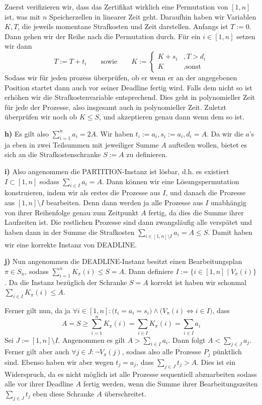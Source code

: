 \documentclass[a4paper,graphics,11pt]{article}
\begin{document}
Zuerst verifizieren wir, dass das Zertifikat wirklich eine Permutation von $[1,n]$ ist, was mit $n$ Speicherzellen
in linearer Zeit geht.
Daraufhin haben wir Variablen $K,T$, die jeweils momentane Strafkosten und Zeit darstellen.
Anfangs ist $T := 0$. Dann gehen wir der Reihe nach die Permutation durch. Für ein $i \in [1,n]$ setzen wir dann
$$
    T := T + t_i
    \qquad\text{sowie}\qquad
    K := \begin{cases}
        K + s_i &, T > d_i\\
        K&, \text{sonst}
    \end{cases}
$$
Sodass wir für jeden prozess überprüfen, ob er wenn er an der angegebenen Position startet dann auch vor seiner Deadline
fertig wird. Falls dem nicht so ist erhöhen wir die Strafkostenvariable entsprechend. Dies geht in polynomieller Zeit
für jede der Prozesse, also insgesamt auch in polynomieller Zeit. Zuletzt überprüfen wir noch ob $K \leq S$,
und akzeptieren genau dann wenn dem so ist.

\textbf{h)}
Es gilt also $\sum_{i=1}^{n} a_i = 2A$. Wir haben $t_i := a_i, s_i := a_i, d_i = A$. Da wir die $a$'s ja eben in
zwei Teilsummen mit jeweiliger Summe $A$ aufteilen wollen, bietet es sich an die Strafkostenschranke $S := A$ zu definieren.

\textbf{i)}
Also angenommen die PARTITION-Instanz ist lösbar, d.h. es existiert $I \subset [1,n]$ sodass $\sum_{i\in I} a_i = A$.
Dann können wir eine Lösungspermutation konstruieren, indem wir als erstes die Prozesse aus $I$, und danach
die Prozesse aus $[1,n]\setminus I$ bearbeiten. Denn dann werden ja alle Prozesse aus $I$ unabhängig von ihrer
Reihenfolge genau zum Zeitpunkt $A$ fertig, da dies die Summe ihrer Laufzeiten ist. Die restlichen Prozesse
sind dann zwangsläufig alle verspätet und haben dann in der Summe die Strafkosten $\sum_{i \in [1,n]\setminus I} a_i = A \leq S$.
Damit haben wir eine korrekte Instanz von DEADLINE.

\newpage

\textbf{j)}
Nun angenommen die DEADLINE-Instanz besitzt einen Bearbeitungsplan $\pi \in S_n$, sodass $\sum_{i=1}^{n} K_\pi(i) \leq S = A$.
Dann definiere $I := \{i \in [1,n] \mid V_\pi(i)\}$. Da die Instanz bezüglich der Schranke $S = A$ korrekt ist
haben wir schonmal $\sum_{i\in I} K_\pi(i) \leq A$.

Ferner gilt nun, da ja $\forall i \in [1,n]: \bigg(t_i = a_i = s_i\bigg) \land \bigg(V_\pi(i) \iff i \in I\bigg)$, dass
$$
    A = S \geq \sum_{i=1}^{n} K_\pi(i) = \sum_{i \in I} K_\pi(i) = \sum_{i \in I} a_i
$$
Sei $J := [1,n] \setminus I$. Angenommen es gilt $A > \sum_{i\in I} a_i$. Dann folgt $A < \sum_{j \in J} a_j$.
Ferner gilt aber auch $\forall j \in J: \lnot V_\pi(j)$, sodass also alle Prozesse $P_j$ pünktlich sind.
Ebenso haben wir aber wegen $t_j = a_j$, dass $\sum_{j \in J} t_j > A$. Dies ist ein Widerspruch,
da es nicht möglich ist alle Prozesse sequentiell abzuarbeiten sodass alle vor ihrer Deadline $A$ fertig werden,
wenn die Summe ihrer Bearbeitungszeiten $\sum_{j \in J} t_j$ eben diese Schranke $A$ überschreitet.
\end{document}
